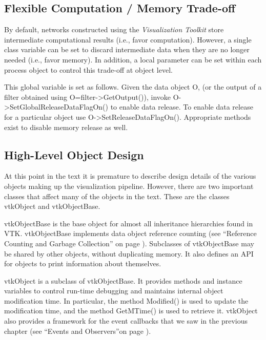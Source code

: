 \subsection{Flexible Computation / Memory Trade-off}
\label{subsec:flexible_computation_memory_trade-off}

By default, networks constructed using the \emph{Visualization Toolkit} store intermediate computational results (i.e., favor computation). However, a single class variable can be set to discard intermediate data when they are no longer needed (i.e., favor memory). In addition, a local parameter can be set within each process object to control this trade-off at object level.

This global variable is set as follows. Given the data object O, (or the output of a filter obtained using O=filter->GetOutput()), invoke O->SetGlobalReleaseDataFlagOn() to enable data release. To enable data release for a particular object use O->SetReleaseDataFlagOn(). Appropriate methods exist to disable memory release as well.

\subsection{High-Level Object Design}
\label{subsec:high-level_object_design}

At this point in the text it is premature to describe design details of the various objects making up the visualization pipeline. However, there are two important classes that affect many of the objects in the text. These are the classes vtkObject and vtkObjectBase.

vtkObjectBase is the base object for almost all inheritance hierarchies found in VTK. vtkObjectBase implements data object reference counting (see ``Reference Counting and Garbage Collection'' on page \pageref{subsec:reference_counting_garbage_collection}). Subclasses of vtkObjectBase may be shared by other objects, without duplicating memory. It also defines an API for objects to print information about themselves.

vtkObject is a subclass of vtkObjectBase. It provides methods and instance variables to control run-time debugging and maintains internal object modification time. In particular, the method Modified() is used to update the modification time, and the method GetMTime() is used to retrieve it. vtkObject also provides a framework for the event callbacks that we saw in the previous chapter (see ``Events and Observers''on page \pageref{sub:examples_events_observers}).

